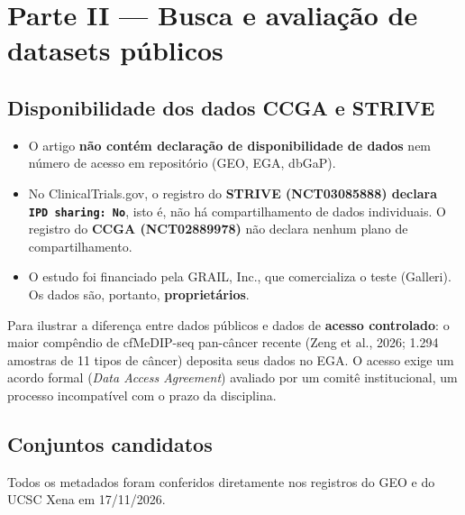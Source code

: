 \documentclass[11pt,a4paper]{article}
\providecommand{\tightlist}{\setlength{\itemsep}{0pt}\setlength{\parskip}{0pt}}
\begin{document}
\section{Parte II --- Busca e avaliação de datasets públicos}

\subsection{Disponibilidade dos dados CCGA e STRIVE}

\begin{itemize}
\tightlist
\item
  O artigo \textbf{não contém declaração de disponibilidade de dados} nem número
  de acesso em repositório (GEO, EGA, dbGaP).
\item
  No ClinicalTrials.gov, o registro do \textbf{STRIVE (NCT03085888) declara
  \texttt{IPD\ sharing:\ No}}, isto é, não há compartilhamento de dados
  individuais. O registro do \textbf{CCGA (NCT02889978)} não declara nenhum
  plano de compartilhamento.
\item
  O estudo foi financiado pela GRAIL, Inc., que comercializa o teste (Galleri).
  Os dados são, portanto, \textbf{proprietários}.
\end{itemize}

Para ilustrar a diferença entre dados públicos e dados de \textbf{acesso
controlado}: o maior compêndio de cfMeDIP-seq pan-câncer recente (Zeng et al.,
2026; 1.294 amostras de 11 tipos de câncer) deposita seus dados no EGA. O acesso
exige um acordo formal (\emph{Data Access Agreement}) avaliado por um comitê
institucional, um processo incompatível com o prazo da disciplina.

\subsection{Conjuntos candidatos}

Todos os metadados foram conferidos diretamente nos registros do GEO e do UCSC
Xena em 17/11/2026.
\end{document}

